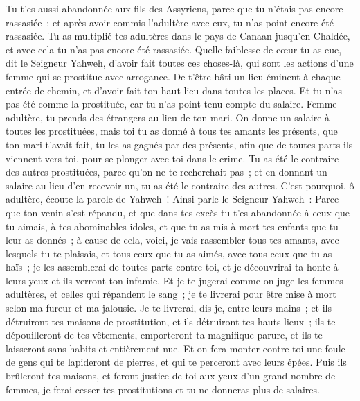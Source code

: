 \begin{multicols}{2}
Tu t'es aussi abandonnée aux fils des Assyriens, parce que tu n'étais pas encore rassasiée~; et après avoir commis l'adultère avec eux, tu n'as point encore été rassasiée.
Tu as multiplié tes adultères dans le pays de Canaan jusqu'en Chaldée, et avec cela tu n'as pas encore été rassasiée.
Quelle faiblesse de cœur tu as eue, dit le Seigneur Yahweh, d'avoir fait toutes ces choses-là, qui sont les actions d'une femme qui se prostitue avec arrogance.
De t'être bâti un lieu éminent à chaque entrée de chemin, et d'avoir fait ton haut lieu dans toutes les places. Et tu n'as pas été comme la prostituée, car tu n'as point tenu compte du salaire.
Femme adultère, tu prends des étrangers au lieu de ton mari.
On donne un salaire à toutes les prostituées, mais toi tu as donné à tous tes amants les présents, que ton mari t'avait fait, tu les as gagnés par des présents, afin que de toutes parts ils viennent vers toi, pour se plonger avec toi dans le crime.
Tu as été le contraire des autres prostituées, parce qu'on ne te recherchait pas~; et en donnant un salaire au lieu d'en recevoir un, tu as été le contraire des autres.
C'est pourquoi, ô adultère, écoute la parole de Yahweh~!
Ainsi parle le Seigneur Yahweh~: Parce que ton venin s'est répandu, et que dans tes excès tu t'es abandonnée à ceux que tu aimais, à tes abominables idoles, et que tu as mis à mort tes enfants que tu leur as donnés~;
à cause de cela, voici, je vais rassembler tous tes amants, avec lesquels tu te plaisais, et tous ceux que tu as aimés, avec tous ceux que tu as haïs~; je les assemblerai de toutes parts contre toi, et je découvrirai ta honte à leurs yeux et ils verront ton infamie.
Et je te jugerai comme on juge les femmes adultères, et celles qui répandent le sang~; je te livrerai pour être mise à mort selon ma fureur et ma jalousie.
Je te livrerai, dis-je, entre leurs mains~; et ils détruiront tes maisons de prostitution, et ils détruiront tes hauts lieux~; ils te dépouilleront de tes vêtements, emporteront ta magnifique parure, et ils te laisseront sans habits et entièrement nue.
Et on fera monter contre toi une foule de gens qui te lapideront de pierres, et qui te perceront avec leurs épées.
Puis ils brûleront tes maisons, et feront justice de toi aux yeux d'un grand nombre de femmes, je ferai cesser tes prostitutions et tu ne donneras plus de salaires.

\end{multicols}

